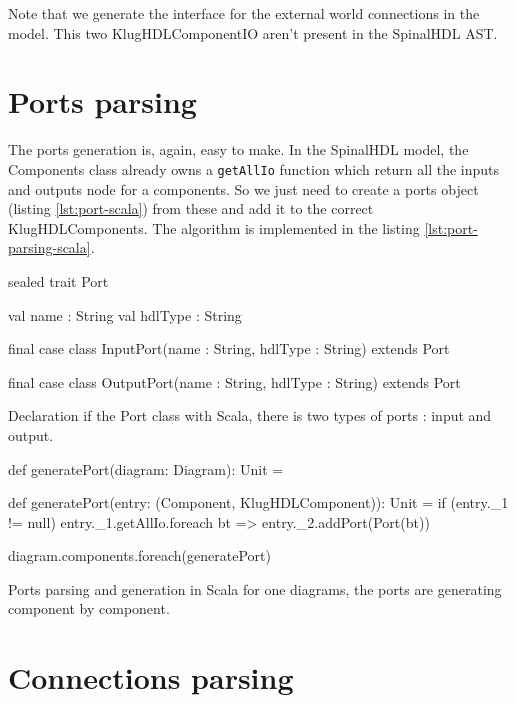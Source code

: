 Note that we generate the interface for the external world connections in the
model. This two KlugHDLComponentIO aren't present in the SpinalHDL AST.

\section{Ports parsing}
\label{sec:ports-parsing}

The ports generation is, again, easy to make. In the SpinalHDL model, the
Components class already owns a \verb|getAllIo| function which return all the
inputs and outputs node for a components. So we just need to create a ports
object (listing \ref{lst:port-scala}) from these and add it to the correct
KlugHDLComponents. The algorithm is implemented in the listing
\ref{lst:port-parsing-scala}.

\begin{listing}[H]
  \centering
  \begin{scalacode}
  sealed trait Port {

    val name : String
    val hdlType : String
  }

  final case class InputPort(name : String, hdlType : String) extends Port

  final case class OutputPort(name : String, hdlType : String) extends Port
  \end{scalacode}
  \caption[Diagram class declaration]{Declaration if the Port class with Scala,
    there is two types of ports : input and output.}
  \label{lst:port-scala}
\end{listing}

\begin{listing}[H]
  \centering
  \begin{scalacode}
  def generatePort(diagram: Diagram): Unit = {
    def generatePort(entry: (Component, KlugHDLComponent)): Unit = {
      if (entry._1 != null) {
        entry._1.getAllIo.foreach { bt =>
          entry._2.addPort(Port(bt))
        }
      }
    }

    diagram.components.foreach(generatePort)
  }
  \end{scalacode}
  \caption[Implementation of the ports parsing]{Ports parsing and generation in
    Scala for one diagrams, the ports are generating component by component.}
  \label{lst:port-parsing-scala}
\end{listing}

\section{Connections parsing}
\label{sec:connections-parsing}

